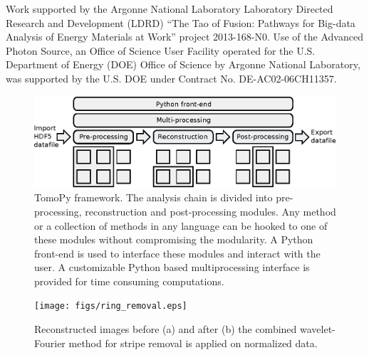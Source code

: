 \documentclass[pdf]{iucr}              %
\begin{document}



Work supported by the Argonne National Laboratory Laboratory Directed Research and Development (LDRD) ``The Tao of Fusion: Pathways for Big-data Analysis of Energy Materials at Work'' project 2013-168-N0. Use of the Advanced Photon Source, an Office of Science User Facility operated for the U.S. Department of Energy (DOE) Office of Science by Argonne National Laboratory, was supported by the U.S. DOE under Contract No. DE-AC02-06CH11357. 





\begin{figure}
\centering
\includegraphics[width=\textwidth]{figs/framework.eps}
\caption{TomoPy framework. The analysis chain is divided into pre-processing, reconstruction and post-processing modules. Any method or a collection of methods in any language can be hooked to one of these modules without compromising the modularity. A Python front-end is used to interface these modules and interact with the user. A customizable Python based multiprocessing interface is provided for time consuming computations.}
\label{fig:Framework}
\end{figure}

\begin{figure}
\centering
\texttt{[image: figs/ring\_removal.eps]}
\caption{Reconstructed images before (a) and after (b) the combined wavelet-Fourier method for stripe removal is applied on normalized data.}
\label{fig:ProcessRing}
\end{figure}
\end{document}
